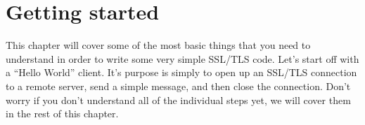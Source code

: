 \chapter{Getting started}
This chapter will cover some of the most basic things that you need to 
understand in order to write some very simple SSL/TLS code. Let's start off with a
``Hello World'' client. It's purpose is simply to open up an SSL/TLS connection
to a remote server, send a simple message, and then close the connection. Don't
worry if you don't understand all of the individual steps yet, we will cover
them in the rest of this chapter.
